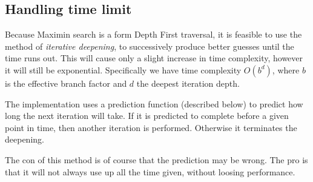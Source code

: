 \documentclass[a4paper,11pt]{article}
\begin{document}
\subsection{Handling time limit}
Because Maximin search is a form Depth First traversal, it is feasible to use the method of \textit{iterative deepening}, to successively produce better guesses until the time runs out. This will cause only a slight increase in time complexity, however it will still be exponential. Specifically we have time complexity $O(b^d)$, where $b$ is the effective branch factor and $d$ the deepest iteration depth.

The implementation uses a prediction function (described below) to predict how long the next iteration will take. If it is predicted to complete before a given point in time, then another iteration is performed. Otherwise it terminates the deepening.

The con of this method is of course that the prediction may be wrong. The pro is that it will not always use up all the time given, without loosing performance.

%
\end{document}
